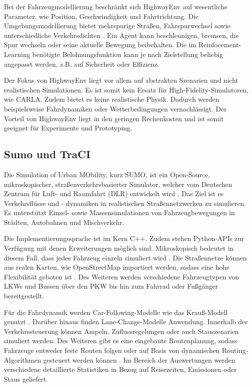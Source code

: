 Bei der Fahrzeugmodellierung beschränkt sich HighwayEnv auf wesentliche Parameter, wie Position, Geschwindigkeit und Fahrtrichtung. Die Umgebungsmodellierung bietet mehrspurige Straßen, Fahrspurwechsel sowie unterschiedliche Verkehrsdichten \cite{highway-env}. Ein Agent kann beschleunigen, bremsen, die Spur wechseln oder seine aktuelle Bewegung beibehalten. Die im Reinfocement-Learning benötigte Belohnungsfunktion kann je nach Zielstellung beliebig angepasst werden, z.B. auf Sicherheit oder Effizienz. 

Der Fokus von HighwayEnv liegt vor allem auf abstrakten Szenarien und nicht realistischen Simulationen. Es ist somit kein Ersatz für High-Fidelity-Simulatoren, wie CARLA. Zudem bietet es keine realistische Physik. Dadurch werden beispielsweise Fahrdynamiken oder Wetterbedingungen vernachlässigt. Der Vorteil von HighwayEnv liegt in den geringen Rechenkosten und ist somit geeignet für Experimente und Prototyping.
\subsection{Sumo und TraCI}
Die Simulation of Urban MObility, kurz SUMO, ist ein Open-Source, mikroskopischer, straßenverkehrsbasierter Simulator, welcher vom Deutschen Zentrum für Luft- und Raumfahrt (DLR) entwickelt wird \cite{SUMO2018}. Das Ziel ist es Verkehrsflüsse und - dynamiken in realistischen Straßennetzwerken zu simulieren. Es unterstützt Einzel- sowie Massensimulationen von Fahrzeugbewegungen in Städten, Autobahnen und Mischverkehr.

Die Implementierungssprache ist im Kern C++. Zudem stehen Python-APIs zur Verfügung mit denen Erweiterungen möglich sind. Mikroskopisch bedeutet in diesem Fall, dass jedes Fahrzeug einzeln simuliert wird \cite{sumo_at_a_glance}. Die Straßennetze können aus realen Karten, wie OpenStreetMap importiert werden, sodass eine hohe Flexibilität geboten ist \cite{sumo_open_street_map}. Des Weiteren werden verschiedene Fahrzeugtypen von LKWs und Bussen über den PKW bis hin zum Fahrrad oder Fußgänger bereitgestellt.

Für die Fahrdynamik werden Car-Following-Modelle wie das Krauß-Modell genutzt \cite{sumo_car_following}. Darüber hinaus finden Lane-Change-Modelle Anwendung. Innerhalb der Verkehrssteuerung können Ampeln, Zuflussregelungen oder auch Stauszenarien simuliert werden. Des Weiteren gibt es eine eingebaute Routenplanung, sodass Fahrzeuge entweder feste Routen folgen oder auf Basis von dynamischen Routing-Algorithmen gesteuert werden können \cite{sumo_vehicles}. Im Bereich der Auswertungen werden verschiedene detaillierte Statistiken in Bezug auf Reisezeiten, Emissionen oder Staus geliefert.

